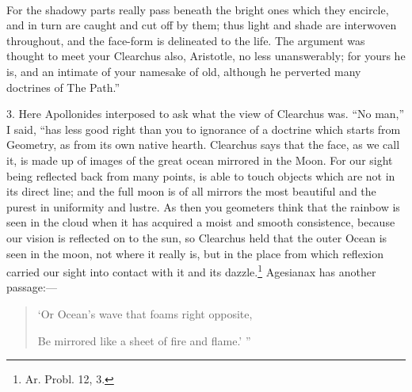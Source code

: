 \documentclass[a4paper, 11pt, oneside, polutonikogreek, english]{article}
\begin{document}
\paragraph{}
For the shadowy parts really pass beneath the bright ones which they encircle, and in turn are caught and cut off by them; thus light and shade are interwoven throughout, and the face-form is delineated to the life. The argument was thought to meet your Clearchus also, Aristotle, no less unanswerably; for yours he is, and an intimate of your namesake of old, although he perverted many doctrines of The Path.''

3. Here Apollonides interposed to ask what the view of Clearchus was. ``No man,'' I said, ``has less good right than you to ignorance of a doctrine which starts from Geometry, as from its own native hearth. Clearchus says that the face, as we call it, is made up of images of the great ocean mirrored in the Moon. For our sight being reflected back from many points, is able to touch objects which are not in its direct line; and the full moon is of all mirrors the most beautiful and the purest in uniformity and lustre. As then you geometers think that the rainbow is seen in the cloud when it has acquired a moist and smooth consistence, because our vision is reflected on to the sun, so Clearchus held that the outer Ocean is seen in the moon, not where it really is, but in the place from which reflexion carried our sight into contact with it and its dazzle.\footnote{Ar. Probl. 12, 3.} Agesianax has another passage:---
\begin{quotation}
`Or Ocean's wave that foams right opposite,

Be mirrored like a sheet of fire and flame.' ''
\end{quotation}
\end{document}
